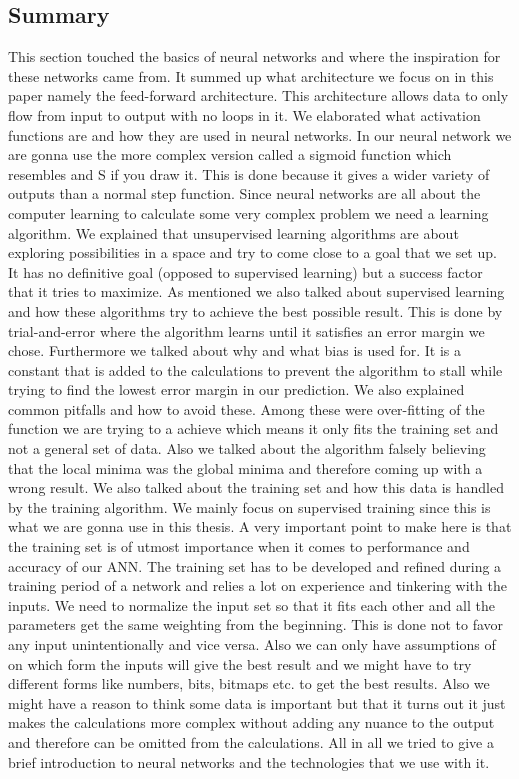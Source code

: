 \subsection{Summary}
This section touched the basics of neural networks and where the inspiration for these networks came from. It summed up what architecture we focus on in this paper namely the feed-forward architecture. This architecture allows data to only flow from input to output with no loops in it. We elaborated what activation functions are and how they are used in neural networks. In our neural network we are gonna use the more complex version called a sigmoid function which resembles and S if you draw it. This is done because it gives a wider variety of outputs than a normal step function. Since neural networks are all about the computer learning to calculate some very complex problem we need a learning algorithm. We explained that unsupervised learning algorithms are about exploring possibilities in a space and try to come close to a goal that we set up. It has no definitive goal (opposed to supervised learning) but a success factor that it tries to maximize. As mentioned we also talked about supervised learning and how these algorithms try to achieve the best possible result. This is done by trial-and-error where the algorithm learns until it satisfies an error margin we chose. Furthermore we talked about why and what bias is used for. It is a constant that is added to the calculations to prevent the algorithm to stall while trying to find the lowest error margin in our prediction. We also explained common pitfalls and how to avoid these. Among these were over-fitting of the function we are trying to a achieve which means it only fits the training set and not a general set of data. Also we talked about the algorithm falsely believing that the local minima was the global minima and therefore coming up with a wrong result.
We also talked about the training set and how this data is handled by the training algorithm. We mainly focus on supervised training since this is what we are gonna use in this thesis. A very important point to make here is that the training set is of utmost importance when it comes to performance and accuracy of our ANN. The training set has to be developed and refined during a training period of a network and relies a lot on experience and tinkering with the inputs. We need to normalize the input set so that it fits each other and all the parameters get the same weighting from the beginning. This is done not to favor any input unintentionally and vice versa. Also we can only have assumptions of on which form the inputs will give the best result and we might have to try different forms like numbers, bits, bitmaps etc. to get the best results. Also we might have a reason to think some data is important but that it turns out it just makes the calculations more complex without adding any nuance to the output and therefore can be omitted from the calculations.
All in all we tried to give a brief introduction to neural networks and the technologies that we use with it.